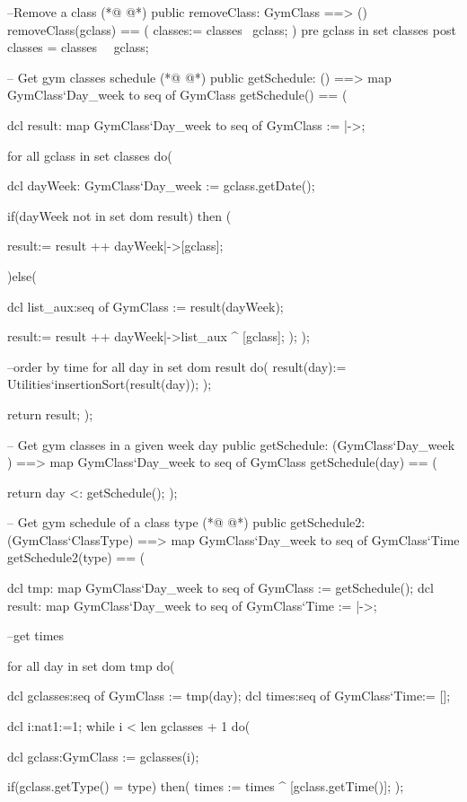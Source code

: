 \begin{vdmpp}[breaklines=true]
 
 --Remove a class 
(*@
\label{removeClass:155}
@*)
 public removeClass: GymClass ==> ()
 removeClass(gclass) == (
  classes:= classes \ {gclass};
 )
 pre gclass in set classes
 post classes = classes~ \ {gclass};
 
 
 -- Get gym classes schedule
(*@
\label{getSchedule:164}
@*)
 public getSchedule: () ==> map GymClass`Day_week to seq of GymClass
 getSchedule() == (
 
  dcl result: map GymClass`Day_week to seq of GymClass := {|->}; 
 
  for all gclass in set classes do(
   
   dcl dayWeek: GymClass`Day_week := gclass.getDate();
   
   if(dayWeek not in set dom result) then (
    
    result:= result ++ {dayWeek|->[gclass]};
    
   )else(
    
    dcl list_aux:seq of GymClass := result(dayWeek);
    
    result:= result ++ {dayWeek|->list_aux ^ [gclass]};
   );
  );
  
  --order by time 
  for all day in set dom result do( 
   result(day):= Utilities`insertionSort(result(day));
  );
  
  return result;
 );
 
 -- Get gym classes in a given week day
 public getSchedule: (GymClass`Day_week ) ==> map GymClass`Day_week to seq of GymClass
 getSchedule(day) == (
 
   return {day} <: getSchedule();
 );
 
 
 -- Get gym schedule of a class type
(*@
\label{getSchedule2:202}
@*)
 public getSchedule2: (GymClass`ClassType) ==> map GymClass`Day_week to seq of GymClass`Time
 getSchedule2(type) == (
 
  dcl tmp: map GymClass`Day_week to seq of GymClass := getSchedule();
  dcl result: map GymClass`Day_week to seq of GymClass`Time := {|->};
  
  --get times
  
  for all day in set dom tmp do( 
    
    dcl gclasses:seq of GymClass := tmp(day);
    dcl times:seq of GymClass`Time:= [];
    
    dcl i:nat1:=1;
    while i < len gclasses + 1 do(
     
     dcl gclass:GymClass := gclasses(i); 
      
     if(gclass.getType() = type) then(
      times := times ^ [gclass.getTime()];
     );
     

\end{vdmpp}
